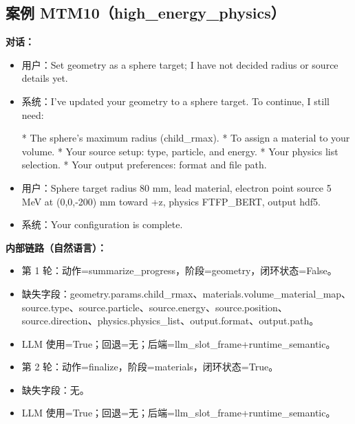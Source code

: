 \documentclass[11pt]{ctexart}
\begin{document}
\subsection{案例 MTM10（high\_energy\_physics）}
\textbf{对话：}
\begin{itemize}
\item 用户：Set geometry as a sphere target; I have not decided radius or source details yet.
\item 系统：I've updated your geometry to a sphere target. To continue, I still need:

*   The sphere's maximum radius (child\_rmax).
*   To assign a material to your volume.
*   Your source setup: type, particle, and energy.
*   Your physics list selection.
*   Your output preferences: format and file path.
\item 用户：Sphere target radius 80 mm, lead material, electron point source 5 MeV at (0,0,-200) mm toward +z, physics FTFP\_BERT, output hdf5.
\item 系统：Your configuration is complete.
\end{itemize}
\textbf{内部链路（自然语言）：}
\begin{itemize}
\item 第 1 轮：动作=summarize\_progress，阶段=geometry，闭环状态=False。
\item 缺失字段：geometry.params.child\_rmax、materials.volume\_material\_map、source.type、source.particle、source.energy、source.position、source.direction、physics.physics\_list、output.format、output.path。
\item LLM 使用=True；回退=无；后端=llm\_slot\_frame+runtime\_semantic。
\item 第 2 轮：动作=finalize，阶段=materials，闭环状态=True。
\item 缺失字段：无。
\item LLM 使用=True；回退=无；后端=llm\_slot\_frame+runtime\_semantic。
\end{itemize}
\end{document}
